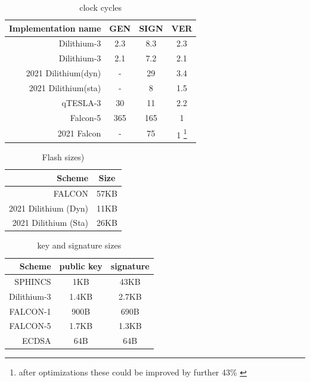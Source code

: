 \documentclass[ucs,10pt]{beamer}
\begin{document}
\begin{frame}[allowframebreaks]
\begin{table}%
    \caption{clock cycles}
    \label{t:clockcycles_comp}
    \centering\begin{tabular}{| r | c c c |}
        \hline
        Implementation name                     & GEN           & SIGN         & VER \\
        \hline
        Dilithium-3 \cite{QR_Iot_Lattice}       & 2.3           & 8.3          & 2.3 \\
        Dilithium-3 \cite{Energy_comp}          & 2.1           & 7.2          & 2.1 \\ %
        2021 Dilithium(dyn)\cite{update_sign}   & -             & 29           & 3.4\\
        2021 Dilithium(sta)\cite{update_sign}   & -             & 8            & 1.5\\
        qTESLA-3 \cite{QR_Iot_Lattice}          & 30            & 11           & 2.2\\
        Falcon-5 \cite{QR_Iot_Lattice}          & 365           & 165          & 1\\
        2021 Falcon  \cite{update_sign}         & -             & 75           & 1 \footnote{after optimizations these could be improved by further 43\% \cite{falcon_micro_impl}}\\
        \hline
    \end{tabular}
    
\end{table}

\begin{table}%
    \caption{Flash sizes)}
    \label{t:flashsize_comp}
    \centering\begin{tabular}{| r | c |}
        \hline
        Scheme & Size \\
        \hline
        FALCON & 57KB \\
        2021 Dilithium (Dyn) & 11KB\\
        2021 Dilithium (Sta) & 26KB\\
        \hline
    \end{tabular}
\end{table}

\begin{table}%
    \caption{key and signature sizes}
    \label{t:key_sig_comp}
    \centering\begin{tabular}{ | r | c c | }
        \hline
        Scheme & public key & signature \\
        \hline
        SPHINCS     & 1KB   & 43KB \\
        Dilithium-3 & 1.4KB & 2.7KB\\
        FALCON-1    & 900B  & 690B\\
        FALCON-5    & 1.7KB & 1.3KB\\
        \hline
        ECDSA       & 64B   & 64B\\
        \hline
    \end{tabular}
\end{table}

\end{frame}
\end{document}
